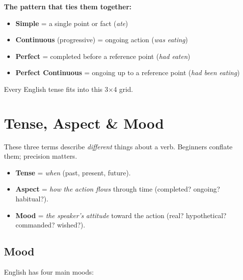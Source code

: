 \documentclass[11pt, letterpaper]{article}
\begin{document}
\begin{tcolorbox}[colback=part4bg, colframe=sectionorange, arc=3pt, boxrule=1pt]
\textbf{The pattern that ties them together:}
\begin{itemize}[noitemsep, leftmargin=*]
  \item \textbf{Simple} = a single point or fact (\emph{ate})
  \item \textbf{Continuous} (progressive) = ongoing action (\emph{was eating})
  \item \textbf{Perfect} = completed before a reference point (\emph{had eaten})
  \item \textbf{Perfect Continuous} = ongoing up to a reference point (\emph{had been eating})
\end{itemize}
Every English tense fits into this 3$\times$4 grid.
\end{tcolorbox}

\section*{Tense, Aspect \& Mood}

These three terms describe \emph{different} things about a verb. Beginners conflate them; precision matters.

\begin{itemize}[noitemsep]
  \item \textbf{Tense} = \emph{when} (past, present, future).
  \item \textbf{Aspect} = \emph{how the action flows} through time (completed? ongoing? habitual?).
  \item \textbf{Mood} = \emph{the speaker's attitude} toward the action (real? hypothetical? commanded? wished?).
\end{itemize}

\subsection*{Mood}

English has four main moods:
\end{document}
